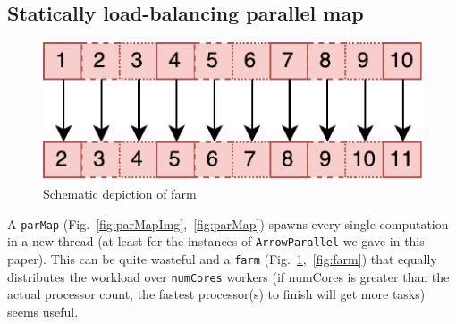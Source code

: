 \documentclass{jfp1}
\newcommand{\inlinecode}[1]{\texttt{#1}}
\begin{document}
\subsection{Statically load-balancing parallel map}
\begin{figure}[h]
	\includegraphics[scale=0.7]{images/farm}
	\caption{Schematic depiction of farm}
	\label{fig:farmImg}
\end{figure}
A \inlinecode{parMap} (Fig.~\ref{fig:parMapImg},~\ref{fig:parMap}) spawns every single computation in a new thread (at least for the instances of \inlinecode{ArrowParallel} we gave in this paper). This can be quite wasteful and a \inlinecode{farm} (Fig.~\ref{fig:farmImg},~\ref{fig:farm}) that equally distributes the workload over \inlinecode{numCores} workers (if numCores is greater than the actual processor count, the fastest processor(s) to finish will get more tasks) seems useful.
\end{document}
